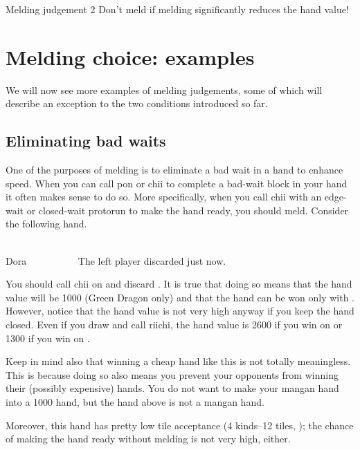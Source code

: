 \bigskip
\color{MyRed}
\begin{itembox}[c]{Melding judgement 2}\normalcolor
Don't meld if melding significantly reduces the hand value!
\end{itembox}\normalcolor

\bigskip
\section{Melding choice: examples}
We will now see more examples of melding judgements, some of which will describe an exception to the two conditions introduced so far. 

\subsection{Eliminating bad waits}
One of the purposes of melding is to eliminate a bad wait in a hand to enhance speed. When you can call {\jap pon} or {\jap chii} to complete a bad-wait block in your hand it often makes sense to do so. More specifically, when you call {\jap chii} with an edge-wait or closed-wait protorun to make the hand ready, you should meld. Consider the following hand.

\begin{screen}
\bp
{}\fa\fa~~\xi\\
\hfill\footnotesize{{\jap Dora}~~~~~~~~~~}
\ep
\vspace{-20pt}The left player discarded {\LARGE{}} just now.
\end{screen}
\noindent
You should call {\jap chii} on {\LARGE{}} and discard {\LARGE{}}. It is true that doing so means that the hand value will be 1000 (Green Dragon only) and that the hand can be won only with {\LARGE\fa}. However, notice that the hand value is not very high anyway if you keep the hand closed. Even if you draw {\LARGE{}} and call riichi, the hand value is 2600 if you win on {\LARGE\fa} or 1300 if you win on {\LARGE{}}. 

\bigskip
Keep in mind also that winning a cheap hand like this is not totally meaningless.  This is because doing so also means you prevent your opponents from winning their (possibly expensive) hands. You do not want to make your {\jap mangan} hand into a 1000 hand, but the hand above is not a {\jap mangan} hand.

\bigskip
Moreover, this hand has pretty low tile acceptance (4 kinds--12 tiles, {\LARGE{}\fa}); the chance of making the hand ready without melding is not very high, either. 

